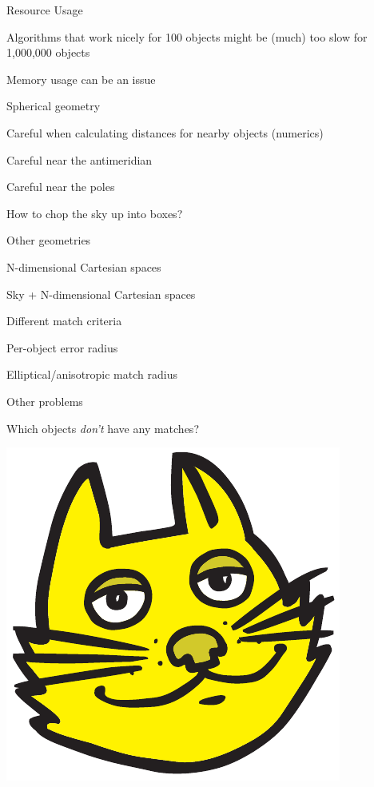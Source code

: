 \documentclass[20pt,landscape]{foils}
\begin{document}

\begin{list1}
  \item Resource Usage
\vspace*{-0.2cm}
  \begin{list2}
    \item Algorithms that work nicely for 100 objects might be
          (much) too slow for 1,000,000 objects
    \item Memory usage can be an issue
  \end{list2}
  \item Spherical geometry
\vspace*{-0.2cm}
  \begin{list2}
    \item Careful when calculating distances for nearby objects (numerics)
    \item Careful near the antimeridian
    \item Careful near the poles
    \item How to chop the sky up into boxes?
  \end{list2}
  \item Other geometries
\vspace*{-0.2cm}
  \begin{list2}
    \item N-dimensional Cartesian spaces
    \item Sky + N-dimensional Cartesian spaces
  \end{list2}
  \item Different match criteria
\vspace*{-0.2cm}
  \begin{list2}
    \item Per-object error radius
    \item Elliptical/anisotropic match radius
  \end{list2}
  \item Other problems
\vspace*{-0.2cm}
  \begin{list2}
    \item Which objects {\sl don't\/} have any matches?
  \end{list2}
\end{list1}

\newpage

\begin{center}
\includegraphics[scale=2.7]{tclogo.pdf}
\end{center}

\label{lastPage}
\end{document}
